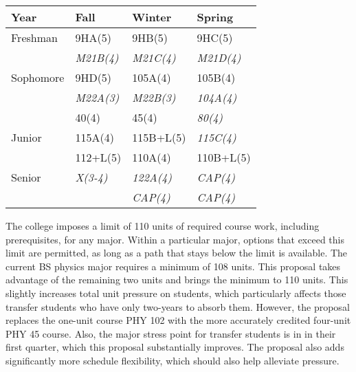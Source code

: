 \documentclass[12pt]{article}
\begin{document}
\vskip 2cm
\label{tbl:proposed-honors}
\begin{center}
\begin{tabular}{|l|l|l|l|}
\hline
Year      & Fall    & Winter & Spring \\
\hline
Freshman  & 9HA(5)       & 9HB(5)        & 9HC(5) \\
          & {\it M21B(4)} & {\it M21C(4)}  & {\it M21D(4)}\\
\hline
Sophomore & 9HD(5)       & 105A(4)      & 105B(4) \\
          & {\it M22A(3)} & {\it M22B(3)} & {\it 104A(4)} \\
          & 40(4)        & 45(4)       & {\it 80(4)}  \\
\hline
Junior    & 115A(4) & 115B+L(5)  & {\it 115C(4)}\\
          & 112+L(5)  & 110A(4)  & 110B+L(5)\\
\hline
Senior    & {\it X(3-4)} & {\it 122A(4)} & {\it CAP(4)} \\
          &              & {\it CAP(4)} & {\it CAP(4)} \\
\hline  
\end{tabular}
\end{center}

\newpage
The college imposes a limit of 110 units of required course work,
including prerequisites, for any major.  Within a particular major,
options that exceed this limit are permitted, as long as a path that
stays below the limit is available.  The current BS physics major
requires a minimum of 108 units.  This proposal takes advantage of the
remaining two units and brings the minimum to 110 units.  This
slightly increases total unit pressure on students, which particularly
affects those transfer students who have only two-years to absorb
them.  However, the proposal replaces the one-unit course PHY 102 with
the more accurately credited four-unit PHY 45 course.  Also, the major
stress point for transfer students is in in their first quarter, which
this proposal substantially improves.  The proposal also adds
significantly more schedule flexibility, which should also help
alleviate pressure.
\end{document}
